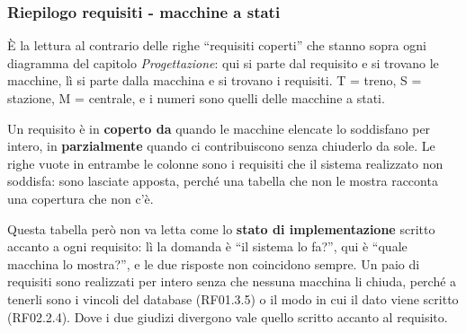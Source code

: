 \documentclass[11pt]{article}
\begin{document}
\subsubsection{Riepilogo requisiti - macchine a stati}
\label{sec:orgdb96ed0}

È la lettura al contrario delle righe ``requisiti coperti'' che stanno sopra ogni diagramma del
capitolo \emph{Progettazione}: qui si parte dal requisito e si trovano le macchine, lì si parte dalla
macchina e si trovano i requisiti. T = treno, S = stazione, M = centrale, e i numeri sono quelli
delle macchine a stati.

Un requisito è in \textbf{coperto da} quando le macchine elencate lo soddisfano per intero, in
\textbf{parzialmente} quando ci contribuiscono senza chiuderlo da sole. Le righe vuote in entrambe le
colonne sono i requisiti che il sistema realizzato non soddisfa: sono lasciate apposta, perché una
tabella che non le mostra racconta una copertura che non c'è.

Questa tabella però non va letta come lo \textbf{stato di implementazione} scritto accanto a ogni
requisito: lì la domanda è ``il sistema lo fa?'', qui è ``quale macchina lo mostra?'', e le due risposte
non coincidono sempre. Un paio di requisiti sono realizzati per intero senza che nessuna macchina li
chiuda, perché a tenerli sono i vincoli del database (RF01.3.5) o il modo in cui il dato viene
scritto (RF02.2.4). Dove i due giudizi divergono vale quello scritto accanto al requisito.
\end{document}
